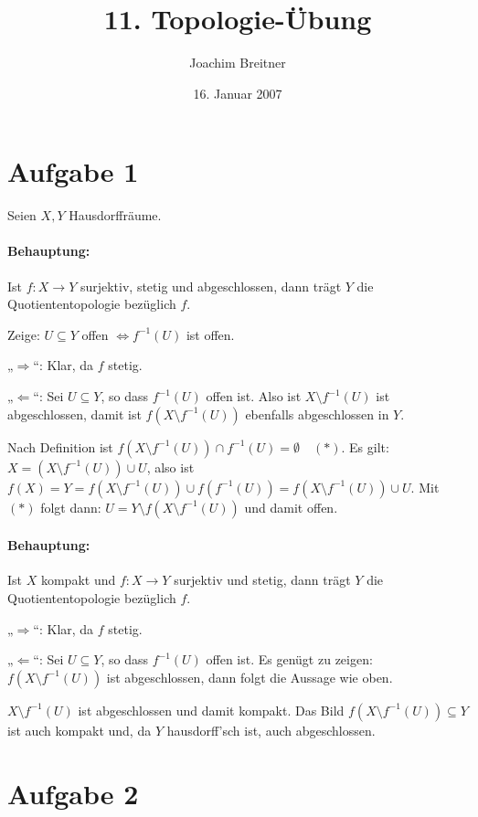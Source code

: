 \documentclass{article}
\title{11. Topologie-Übung}
\author{Joachim Breitner}
\date{16. Januar 2007}
\begin{document}
\maketitle

\section*{Aufgabe 1}

Seien $X,Y$ Hausdorffräume.

\paragraph{Behauptung:} Ist $f:X\to Y$ surjektiv, stetig und abgeschlossen, dann trägt $Y$ die Quotiententopologie bezüglich $f$.

Zeige: $U\subseteq Y$ offen $\iff f^{-1}(U)$ ist offen.

„$\Longrightarrow$“: Klar, da $f$ stetig.

„$\Longleftarrow$“: Sei $U\subseteq Y$, so dass $f^{-1}(U)$ offen ist. Also ist $X\setminus f^{-1}(U)$ ist abgeschlossen, damit ist $f(X\setminus f^{-1}(U))$ ebenfalls abgeschlossen in $Y$.

Nach Definition ist $f(X\setminus f^{-1}(U)) \cap f^{-1}(U) = \emptyset\quad (*)$. Es gilt: $X=(X\setminus f^{-1}(U)) \cup U$, also ist  $f(X) = Y = f(X\setminus f^{-1}(U)) \cup f(f^{-1}(U)) = f(X\setminus f^{-1}(U)) \cup U$. Mit $(*)$ folgt dann: $U=Y\setminus f(X\setminus f^{-1}(U))$ und damit offen.


\paragraph{Behauptung:} Ist $X$ kompakt und $f:X\to Y$ surjektiv und stetig, dann trägt $Y$ die Quotiententopologie bezüglich $f$.


„$\Longrightarrow$“: Klar, da $f$ stetig.

„$\Longleftarrow$“: Sei $U\subseteq Y$, so dass $f^{-1}(U)$ offen ist. Es genügt zu zeigen: $f(X\setminus f^{-1}(U))$ ist abgeschlossen, dann folgt die Aussage wie oben.

$X\setminus f^{-1}(U)$ ist abgeschlossen und damit kompakt. Das Bild $f(X\setminus f^{-1}(U))\subseteq Y$ ist auch kompakt und, da $Y$ hausdorff’sch ist, auch abgeschlossen.

\section*{Aufgabe 2}
\end{document}
